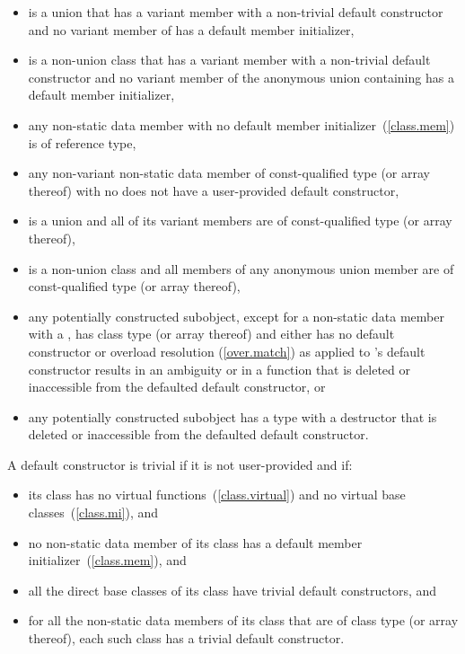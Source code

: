 \begin{itemize}
\item {} is a union that has a variant member
with a non-trivial default constructor and
no variant member of  has a default member initializer,
    
\item {} is a non-union class that has a variant member 
with a non-trivial default constructor and
no variant member of the anonymous union containing 
has a default member initializer,

\item any non-static data member with no default member initializer~(\ref{class.mem}) is
of reference type,

\item any non-variant non-static data member of const-qualified type (or array
thereof) with no  does not have a user-provided default constructor,

\item {} is a union and all of its variant members are of const-qualified
type (or array thereof),

\item {} is a non-union class and all members of any anonymous union member are
of const-qualified type (or array thereof),

\item any potentially constructed subobject, except for a non-static data member
with a , has
class type  (or array thereof) and either 
has no default constructor or overload resolution
(\ref{over.match}) as applied to 's default
constructor results in an ambiguity or in a function that is deleted or
inaccessible from the defaulted default constructor, or

\item any potentially constructed subobject has a type
with a destructor that is deleted or inaccessible from the defaulted default
constructor.
\end{itemize}

A default constructor is
trivial
if it is not user-provided and if:

\begin{itemize}
\item
its class has no virtual functions~(\ref{class.virtual}) and no virtual base
classes~(\ref{class.mi}), and

\item no non-static data member of its class has
a default member initializer~(\ref{class.mem}), and

\item
all the direct base classes of its class have trivial default constructors, and

\item
for all the non-static data members of its class that are of class
type (or array thereof), each such class has a trivial default constructor.
\end{itemize}

